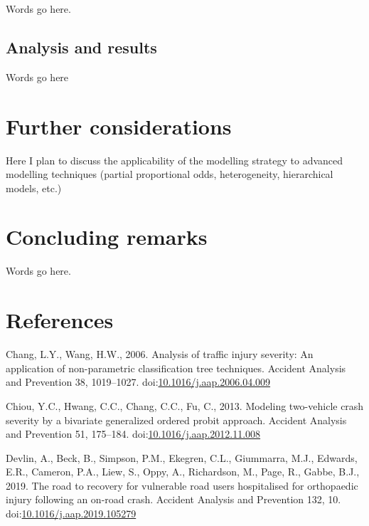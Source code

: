 \documentclass[]{elsarticle} %
\begin{document}
Words go here.

\hypertarget{analysis-and-results}{%
\subsection{Analysis and results}\label{analysis-and-results}}

Words go here

\hypertarget{sec:further-considerations}{%
\section{Further considerations}\label{sec:further-considerations}}

Here I plan to discuss the applicability of the modelling strategy to
advanced modelling techniques (partial proportional odds, heterogeneity,
hierarchical models, etc.)

\hypertarget{sec:concluding-remarks}{%
\section{Concluding remarks}\label{sec:concluding-remarks}}

Words go here.

\hypertarget{references}{%
\section*{References}\label{references}}

\hypertarget{refs}{}
\leavevmode\hypertarget{ref-Chang2006analysis}{}%
Chang, L.Y., Wang, H.W., 2006. Analysis of traffic injury severity: An
application of non-parametric classification tree techniques. Accident
Analysis and Prevention 38, 1019--1027.
doi:\href{https://doi.org/10.1016/j.aap.2006.04.009}{10.1016/j.aap.2006.04.009}

\leavevmode\hypertarget{ref-Chiou2013modeling}{}%
Chiou, Y.C., Hwang, C.C., Chang, C.C., Fu, C., 2013. Modeling
two-vehicle crash severity by a bivariate generalized ordered probit
approach. Accident Analysis and Prevention 51, 175--184.
doi:\href{https://doi.org/10.1016/j.aap.2012.11.008}{10.1016/j.aap.2012.11.008}

\leavevmode\hypertarget{ref-Devlin2019road}{}%
Devlin, A., Beck, B., Simpson, P.M., Ekegren, C.L., Giummarra, M.J.,
Edwards, E.R., Cameron, P.A., Liew, S., Oppy, A., Richardson, M., Page,
R., Gabbe, B.J., 2019. The road to recovery for vulnerable road users
hospitalised for orthopaedic injury following an on-road crash. Accident
Analysis and Prevention 132, 10.
doi:\href{https://doi.org/10.1016/j.aap.2019.105279}{10.1016/j.aap.2019.105279}
\end{document}

